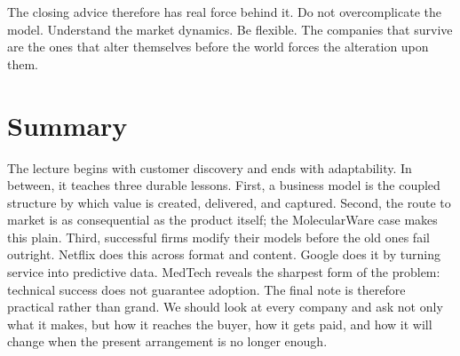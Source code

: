 The closing advice therefore has real force behind it. Do not overcomplicate the model. Understand the market dynamics. Be flexible. The companies that survive are the ones that alter themselves before the world forces the alteration upon them.

\section{Summary}

The lecture begins with customer discovery and ends with adaptability. In between, it teaches three durable lessons. First, a business model is the coupled structure by which value is created, delivered, and captured. Second, the route to market is as consequential as the product itself; the MolecularWare case makes this plain. Third, successful firms modify their models before the old ones fail outright. Netflix does this across format and content. Google does it by turning service into predictive data. MedTech reveals the sharpest form of the problem: technical success does not guarantee adoption. The final note is therefore practical rather than grand. We should look at every company and ask not only what it makes, but how it reaches the buyer, how it gets paid, and how it will change when the present arrangement is no longer enough.
